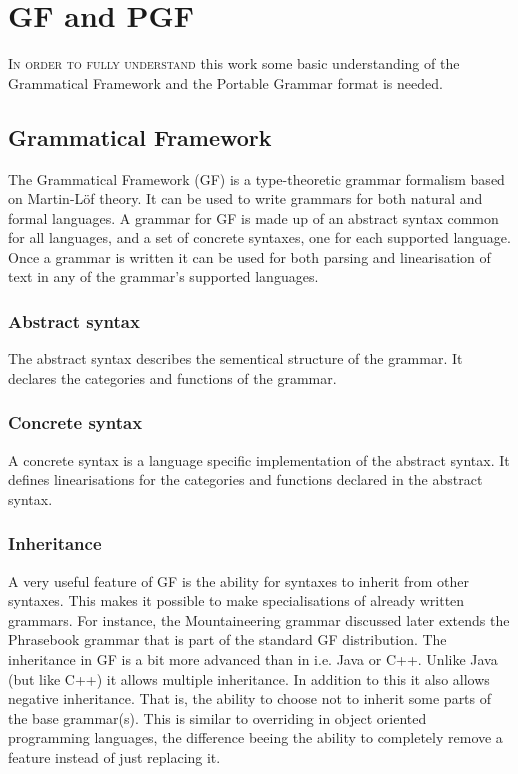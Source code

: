 \chapter{GF and PGF}
\lettrine[lines=4, loversize=-0.1, lraise=0.1]{I}{n order to fully understand} this work some basic understanding of the Grammatical Framework and the Portable Grammar format is needed.

\section{Grammatical Framework}
The Grammatical Framework (GF) is a type-theoretic grammar formalism based on Martin-L\"of theory. It can be used to write grammars for both natural and formal languages.
A grammar for GF is made up of an abstract syntax common for all languages, and a set of concrete syntaxes, one for each supported language.
Once a grammar is written it can be used for both parsing and linearisation of text in any of the grammar's supported languages.

\subsection{Abstract syntax}
The abstract syntax describes the sementical structure of the grammar. It declares the categories and functions of the grammar.

\subsection{Concrete syntax}
A concrete syntax is a language specific implementation of the abstract syntax. It defines linearisations for the categories and functions declared in the abstract syntax.

\subsection{Inheritance}
A very useful feature of GF is the ability for syntaxes to inherit from other syntaxes. This makes it possible to make specialisations of already written grammars. For instance, the Mountaineering grammar discussed later extends the Phrasebook grammar that is part of the standard GF distribution.
The inheritance in GF is a bit more advanced than in i.e. Java or C++. Unlike Java (but like C++) it allows multiple inheritance. In addition to this it also allows negative inheritance. That is, the ability to choose not to inherit some parts of the base grammar(s). This is similar to overriding in object oriented programming languages, the difference beeing the ability to completely remove a feature instead of just replacing it.

